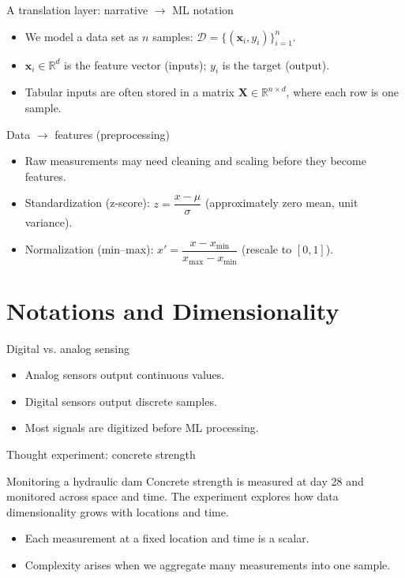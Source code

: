 \documentclass[12pt]{beamer}
\begin{document}
\begin{frame}{A translation layer: narrative $\rightarrow$ ML notation}
  \begin{itemize}
    \item We model a data set as $n$ samples: $\mathcal{D}=\{(\bm{x}_i,y_i)\}_{i=1}^n$.
    \item $\bm{x}_i \in \mathbb{R}^d$ is the feature vector (inputs); $y_i$ is the target (output).
    \item Tabular inputs are often stored in a matrix $\bm{X}\in \mathbb{R}^{n\times d}$, where each row is one sample.
  \end{itemize}
\end{frame}

\begin{frame}{Data $\rightarrow$ features (preprocessing)}
  \begin{itemize}
    \item Raw measurements may need cleaning and scaling before they become features.
    \item Standardization (z-score): $z=\dfrac{x-\mu}{\sigma}$ (approximately zero mean, unit variance).
    \item Normalization (min--max): $x' = \dfrac{x-x_{\min}}{x_{\max}-x_{\min}}$ (rescale to $[0,1]$).
  \end{itemize}
\end{frame}

\section{Notations and Dimensionality}

\begin{frame}{Digital vs. analog sensing}
  \begin{itemize}
    \item Analog sensors output continuous values.
    \item Digital sensors output discrete samples.
    \item Most signals are digitized before ML processing.
  \end{itemize}
\end{frame}

\begin{frame}{Thought experiment: concrete strength}
  \begin{examplebox}{Monitoring a hydraulic dam}
    Concrete strength is measured at day 28 and monitored across space and time.
    The experiment explores how data dimensionality grows with locations and time.
  \end{examplebox}
  \begin{itemize}
    \item Each measurement at a fixed location and time is a scalar.
    \item Complexity arises when we aggregate many measurements into one sample.
  \end{itemize}
\end{frame}
\end{document}
